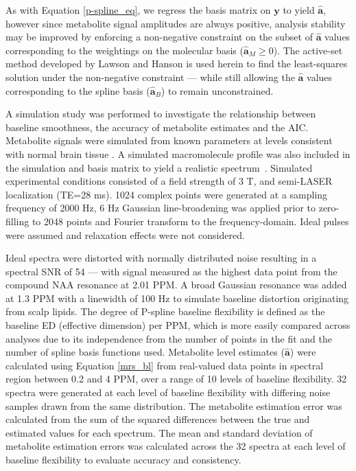 \documentclass[num-refs]{wiley-article}
\begin{document}
As with Equation \ref{p-spline_eq}, we regress the basis matrix on $\mathbf{y}$ to yield $\hat{\mathbf{a}}$, however since metabolite signal amplitudes are always positive, analysis stability may be improved by enforcing a non-negative constraint on the subset of $\hat{\mathbf{a}}$ values corresponding to the weightings on the molecular basis ($\hat{\mathbf{a}}_{M} \geq 0$). The active-set method developed by Lawson and Hanson \cite{Lawson1995} is used herein to find the least-squares solution under the non-negative constraint --- while still allowing the $\hat{\mathbf{a}}$ values corresponding to the spline basis ($\hat{\mathbf{a}}_{B}$) to remain unconstrained.


A simulation study was performed to investigate the relationship between baseline smoothness, the accuracy of metabolite estimates and the AIC. Metabolite signals were simulated from known parameters \cite{Govind2015} at levels consistent with normal brain tissue \cite{deGraaf2018}. A simulated macromolecule profile was also included in the simulation and basis matrix to yield a realistic spectrum~\cite{Birch2017}. Simulated experimental conditions consisted of a field strength of 3 T, and semi-LASER localization (TE=28 ms). 1024 complex points were generated at a sampling frequency of 2000 Hz, 6 Hz Gaussian line-broadening was applied prior to zero-filling to 2048 points and Fourier transform to the frequency-domain. Ideal pulses were assumed and relaxation effects were not considered.

Ideal spectra were distorted with normally distributed noise resulting in a spectral SNR of 54 --- with signal measured as the highest data point from the compound NAA resonance at 2.01 PPM. A broad Gaussian resonance was added at 1.3 PPM with a linewidth of 100 Hz to simulate baseline distortion originating from scalp lipids. The degree of P-spline baseline flexibility is defined as the baseline ED (effective dimension) per PPM, which is more easily compared across analyses due to its independence from the number of points in the fit and the number of spline basis functions used. Metabolite level estimates ($\hat{\mathbf{a}}$) were calculated using Equation \ref{mrs_bl} from real-valued data points in spectral region between 0.2 and 4 PPM, over a range of 10 levels of baseline flexibility. 32 spectra were generated at each level of baseline flexibility with differing noise samples drawn from the same distribution. The metabolite estimation error was calculated from the sum of the squared differences between the true and estimated values for each spectrum. The mean and standard deviation of metabolite estimation errors was calculated across the 32 spectra at each level of baseline flexibility to evaluate accuracy and consistency.
\end{document}
